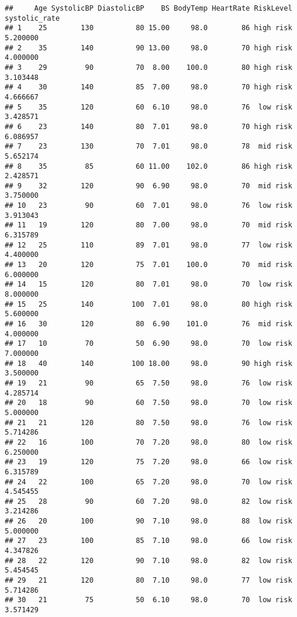 \documentclass[
  ignorenonframetext,
]{beamer}
\begin{document}
\begin{frame}[fragile]
\begin{verbatim}
##     Age SystolicBP DiastolicBP    BS BodyTemp HeartRate RiskLevel systolic_rate
## 1    25        130          80 15.00     98.0        86 high risk      5.200000
## 2    35        140          90 13.00     98.0        70 high risk      4.000000
## 3    29         90          70  8.00    100.0        80 high risk      3.103448
## 4    30        140          85  7.00     98.0        70 high risk      4.666667
## 5    35        120          60  6.10     98.0        76  low risk      3.428571
## 6    23        140          80  7.01     98.0        70 high risk      6.086957
## 7    23        130          70  7.01     98.0        78  mid risk      5.652174
## 8    35         85          60 11.00    102.0        86 high risk      2.428571
## 9    32        120          90  6.90     98.0        70  mid risk      3.750000
## 10   23         90          60  7.01     98.0        76  low risk      3.913043
## 11   19        120          80  7.00     98.0        70  mid risk      6.315789
## 12   25        110          89  7.01     98.0        77  low risk      4.400000
## 13   20        120          75  7.01    100.0        70  mid risk      6.000000
## 14   15        120          80  7.01     98.0        70  low risk      8.000000
## 15   25        140         100  7.01     98.0        80 high risk      5.600000
## 16   30        120          80  6.90    101.0        76  mid risk      4.000000
## 17   10         70          50  6.90     98.0        70  low risk      7.000000
## 18   40        140         100 18.00     98.0        90 high risk      3.500000
## 19   21         90          65  7.50     98.0        76  low risk      4.285714
## 20   18         90          60  7.50     98.0        70  low risk      5.000000
## 21   21        120          80  7.50     98.0        76  low risk      5.714286
## 22   16        100          70  7.20     98.0        80  low risk      6.250000
## 23   19        120          75  7.20     98.0        66  low risk      6.315789
## 24   22        100          65  7.20     98.0        70  low risk      4.545455
## 25   28         90          60  7.20     98.0        82  low risk      3.214286
## 26   20        100          90  7.10     98.0        88  low risk      5.000000
## 27   23        100          85  7.10     98.0        66  low risk      4.347826
## 28   22        120          90  7.10     98.0        82  low risk      5.454545
## 29   21        120          80  7.10     98.0        77  low risk      5.714286
## 30   21         75          50  6.10     98.0        70  low risk      3.571429

\end{verbatim}
\end{frame}
\end{document}
